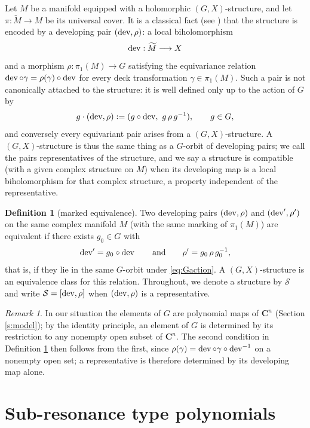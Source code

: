 \documentclass[english,11pt]{amsart}
\theoremstyle{definition}
\newtheorem{definition}[theorem]{Definition}
\theoremstyle{remark}
\newtheorem{remark}[theorem]{Remark}
\numberwithin{equation}{section}
\newcommand{\C}{\mathbf{C}}
\newcommand{\dev}{\mathop{\rm dev}\nolimits}
\newcommand{\Sc}{\mathcal{S}}
\begin{document}
Let $M$ be a manifold equipped with a holomorphic $(G,X)$-structure, and let $\pi:\widetilde M\to M$ be its universal cover. It is a classical fact (see \cite{Goldman,Thurston}) that the structure is encoded by a developing pair $(\dev,\rho)$: a local biholomorphism
\[
\dev:\widetilde M\longrightarrow X
\]
and a morphism $\rho:\pi_1(M)\to G$ satisfying the equivariance relation $\dev\circ\gamma=\rho(\gamma)\circ\dev$ for every deck transformation $\gamma\in\pi_1(M)$. Such a pair is not canonically attached to the structure: it is well defined only up to the action of $G$ by
\begin{equation}\label{eq:Gaction}
g\cdot(\dev,\rho):=(g\circ\dev,\ g\,\rho\,g^{-1}),\qquad g\in G,
\end{equation}
and conversely every equivariant pair arises from a $(G,X)$-structure. A $(G,X)$-structure is thus the same thing as a $G$-orbit of developing pairs; we call the pairs representatives of the structure, and we say a structure is compatible (with a given complex structure on $M$) when its developing map is a local biholomorphism for that complex structure, a property independent of the representative.

\begin{definition}[marked equivalence]\label{d:equivalence}
Two developing pairs $(\dev,\rho)$ and $(\dev',\rho')$ on the same complex manifold $M$ (with the same marking of $\pi_1(M)$) are equivalent if there exists $g_0\in G$ with
\[
\dev'=g_0\circ\dev\qquad\text{and}\qquad \rho'=g_0\,\rho\,g_0^{-1},
\]
that is, if they lie in the same $G$-orbit under \eqref{eq:Gaction}. A $(G,X)$-structure is an equivalence class for this relation. Throughout, we denote a structure by $\Sc$ and write $\Sc=[\dev,\rho]$ when $(\dev,\rho)$ is a representative.
\end{definition}

\begin{remark}\label{r:faithful}
In our situation the elements of $G$ are polynomial maps of $\C^n$ (Section \ref{s:model}); by the identity principle, an element of $G$ is determined by its restriction to any nonempty open subset of $\C^n$. The second condition in Definition \ref{d:equivalence} then follows from the first, since $\rho(\gamma)=\dev\circ\gamma\circ\dev^{-1}$ on a nonempty open set; a representative is therefore determined by its developing map alone.
\end{remark}


\section{Sub-resonance type polynomials} \label{s: srpoly}\label{s:sr}
\end{document}
